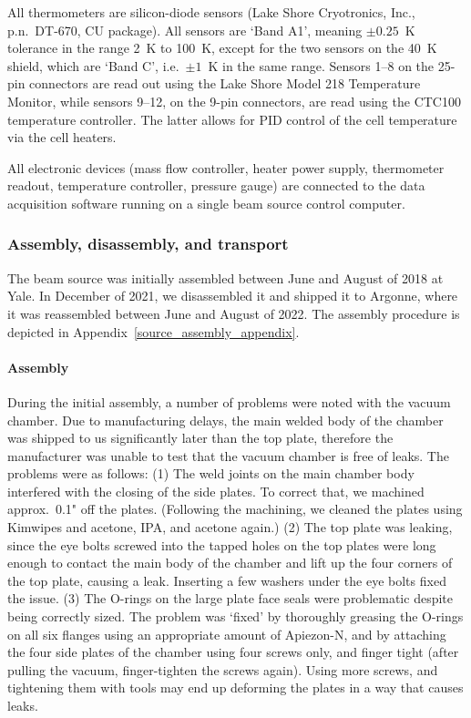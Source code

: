 All thermometers are silicon-diode sensors (Lake Shore Cryotronics, Inc., p.n.\
DT-670, CU package). All sensors are `Band A1', meaning $\pm0.25$~K tolerance in
the range 2~K to 100~K, except for the two sensors on the 40~K shield, which are
`Band C', i.e.\ $\pm1$~K in the same range. Sensors 1--8 on the 25-pin
connectors are read out using the Lake Shore Model 218 Temperature Monitor,
while sensors 9--12, on the 9-pin connectors, are read using the CTC100
temperature controller. The latter allows for PID control of the cell
temperature via the cell heaters.

All electronic devices (mass flow controller, heater power supply, thermometer
readout, temperature controller, pressure gauge) are connected to the data
acquisition software running on a single beam source control computer.

\subsubsection{Assembly, disassembly, and transport}

The beam source was initially assembled between June and August of 2018 at Yale.
In December of 2021, we disassembled it and shipped it to Argonne, where it was
reassembled between June and August of 2022. The assembly procedure is depicted
in Appendix~\ref{source_assembly_appendix}.

\paragraph{Assembly}

During the initial assembly, a number of problems were noted with the vacuum
chamber. Due to manufacturing delays, the main welded body of the chamber was
shipped to us significantly later than the top plate, therefore the manufacturer
was unable to test that the vacuum chamber is free of leaks. The problems were
as follows: (1) The weld joints on the main chamber body interfered with the
closing of the side plates. To correct that, we machined approx.\ 0.1" off the
plates.  (Following the machining, we cleaned the plates using Kimwipes and
acetone, IPA, and acetone again.) (2) The top plate was leaking, since the eye
bolts screwed into the tapped holes on the top plates were long enough to
contact the main body of the chamber and lift up the four corners of the top
plate, causing a leak. Inserting a few washers under the eye bolts fixed the
issue. (3) The O-rings on the large plate face seals were problematic despite
being correctly sized. The problem was `fixed' by thoroughly greasing the
O-rings on all six flanges using an appropriate amount of Apiezon-N, and by
attaching the four side plates of the chamber using four screws only, and finger
tight (after pulling the vacuum, finger-tighten the screws again). Using more
screws, and tightening them with tools may end up deforming the plates in a way
that causes leaks.

